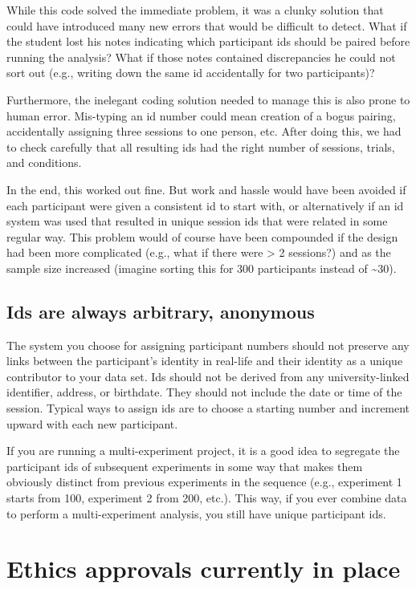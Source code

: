 \documentclass[
  12pt,
]{book}
\begin{document}
While this code solved the immediate problem, it was a clunky solution that could have introduced many new errors that would be difficult to detect. What if the student lost his notes indicating which participant ids should be paired before running the analysis? What if those notes contained discrepancies he could not sort out (e.g., writing down the same id accidentally for two participants)?

Furthermore, the inelegant coding solution needed to manage this is also prone to human error. Mis-typing an id number could mean creation of a bogus pairing, accidentally assigning three sessions to one person, etc. After doing this, we had to check carefully that all resulting ids had the right number of sessions, trials, and conditions.

In the end, this worked out fine. But work and hassle would have been avoided if each participant were given a consistent id to start with, or alternatively if an id system was used that resulted in unique session ids that were related in some regular way. This problem would of course have been compounded if the design had been more complicated (e.g., what if there were \textgreater{} 2 sessions?) and as the sample size increased (imagine sorting this for 300 participants instead of \textasciitilde30).

\subsection{Ids are always arbitrary, anonymous}\label{ids-are-always-arbitrary-anonymous}

The system you choose for assigning participant numbers should not preserve any links between the participant's identity in real-life and their identity as a unique contributor to your data set. Ids should not be derived from any university-linked identifier, address, or birthdate. They should not include the date or time of the session. Typical ways to assign ids are to choose a starting number and increment upward with each new participant.

If you are running a multi-experiment project, it is a good idea to segregate the participant ids of subsequent experiments in some way that makes them obviously distinct from previous experiments in the sequence (e.g., experiment 1 starts from 100, experiment 2 from 200, etc.). This way, if you ever combine data to perform a multi-experiment analysis, you still have unique participant ids.

\section{Ethics approvals currently in place}\label{ethics-approvals-currently-in-place}
\end{document}
